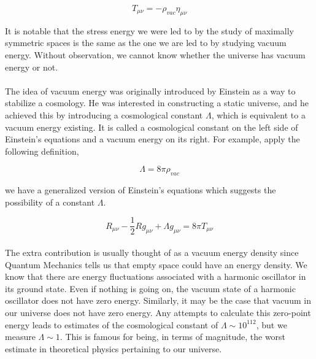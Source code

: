 \documentclass[10pt]{article}
\begin{document}
     \begin{equation}
         {T}_{\mu\nu} = -{\rho}_{vac}{\eta}_{\mu\nu}
     \end{equation}
     
     It is notable that the stress energy we were led to by the study of maximally symmetric spaces is the same as the one we are led to by studying vacuum energy. Without observation, we cannot know whether the universe has vacuum energy or not. 
     
     \paragraph{} The idea of vacuum energy was originally introduced by Einstein as a way to stabilize a cosmology. He was interested in constructing a static universe, and he achieved this by introducing a cosmological constant $\Lambda$, which is equivalent to a vacuum energy existing. It is called a cosmological constant on the left side of Einstein's equations and a vacuum energy on its right. For example, apply the following definition,
     
     \begin{equation}
        \Lambda = 8\pi{\rho}_{vac}    
     \end{equation}

    \noindent we have a generalized version of Einstein's equations which suggests the possibility of a constant $\Lambda$.
    
    \begin{equation}
        {R}_{\mu\nu} - \frac{1}{2}R{g}_{\mu\nu} + \Lambda{g}_{\mu\nu} = 8\pi{T}_{\mu\nu}
    \end{equation}
    
    \paragraph{} The extra contribution is usually thought of as a vacuum energy density since Quantum Mechanics tells us that empty space could have an energy density. We know that there are energy fluctuations associated with a harmonic oscillator in its ground state. Even if nothing is going on, the vacuum state of a harmonic oscillator does not have zero energy. Similarly, it may be the case that vacuum in our universe does not have zero energy. Any attempts to calculate this zero-point energy leads to estimates of the cosmological constant of $\Lambda \sim {10}^{112}$, but we measure $\Lambda \sim 1$. This is famous for being, in terms of magnitude, the worst estimate in theoretical physics pertaining to our universe.
    
\end{document}
